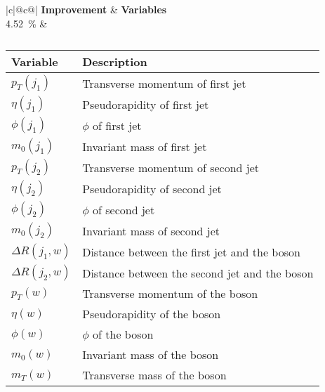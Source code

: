 \begin{table}[h]
    \centering
    \label{tab:app_vars_1}
    \caption{}
    \begin{tabular}{ |c|@{}c@{}| }
        \hline
        \textbf{Improvement} & \textbf{Variables}\\
        \hline
        \SI{4.52}{\%} & 
        \begin{tabular}{ll}
            \hline
            Variable & Description\\
            \hline
            $p_T(j_1)$ & Transverse momentum of first jet\\
            $\eta(j_1)$ & Pseudorapidity of first jet\\
            $\phi(j_1)$ & $\phi$ of first jet\\
            $m_0(j_1)$ & Invariant mass of first jet\\

            $p_T(j_2)$ & Transverse momentum of second jet\\
            $\eta(j_2)$ & Pseudorapidity of second jet\\
            $\phi(j_2)$ & $\phi$ of second jet\\
            $m_0(j_2)$ & Invariant mass of second jet\\

            $\Delta R(j_1, w)$ & Distance between the first jet and the \PWplus boson\\
            $\Delta R(j_2, w)$ & Distance between the second jet and the \PWplus boson\\

            $p_T(w)$ & Transverse momentum of the \PWplus boson\\
            $\eta(w)$ & Pseudorapidity of the \PWplus boson\\
            $\phi(w)$ & $\phi$ of the \PWplus boson\\
            $m_0(w)$ & Invariant mass of the \PWplus boson\\
            $m_T(w)$ & Transverse mass of the \PWplus boson\\
            \hline
        \end{tabular}\\
        \hline
    \end{tabular}
\end{table}

